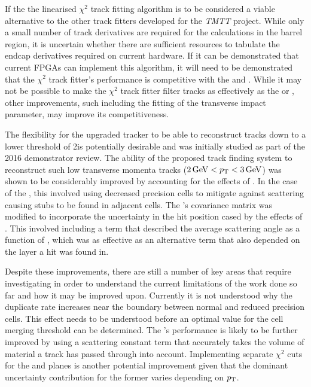 If the the linearised $\chi^{2}$ track fitting algorithm is to be considered a viable alternative to the other track fitters developed for the \emph{TMTT} project.
While only a small number of track derivatives are required for the calculations in the barrel region, it is uncertain whether there are sufficient resources to tabulate the endcap derivatives required on current hardware.
If it can be demonstrated that current FPGAs can implement this algorithm, it will need to be demonstrated that the $\chi^{2}$ track fitter's performance is competitive with the \KF and \LR.
While it may not be possible to make the $\chi^{2}$ track fitter filter tracks as effectively as the \KF or \LR , other improvements, such including the fitting of the transverse impact parameter, may improve its competitiveness.


The flexibility for the upgraded tracker to be able to reconstruct tracks down to a lower \pT threshold of 2\GeV is potentially desirable and was initially studied as part of the 2016 demonstrator review.
The ability of the proposed track finding system to reconstruct such low transverse momenta tracks ($2\,\text{Ge\hspace{-.08em}V} < p_{\mathrm{T}} < 3\,\text{Ge\hspace{-.08em}V}$) was shown to be considerably improved by accounting for the effects of \MS. 
In the case of the \HT, this involved using decreased precision \HT cells to mitigate against scattering causing stubs to be found in adjacent cells.
The \KF's covariance matrix was modified to incorporate the uncertainty in the hit position cased by the effects of \MS.
This involved including a term that described the average scattering angle as a function of \pT, which was as effective as an alternative term that also depended on the layer a hit was found in.

Despite these improvements, there are still a number of key areas that require investigating in order to understand the current limitations of the work done so far and how it may be improved upon.
Currently it is not understood why the duplicate rate increases near the boundary between normal and reduced precision \HT cells.
This effect needs to be understood before an optimal value for the cell merging threshold can be determined.
The \KF's performance is likely to be further improved by using a scattering constant term that accurately takes the volume of material a track has passed through into account.
Implementing separate \KF $\chi^{2}$ cuts for the \rphi and \rz planes is another potential improvement given that the dominant uncertainty contribution for the former varies depending on $p_{\mathrm{T}}$.

